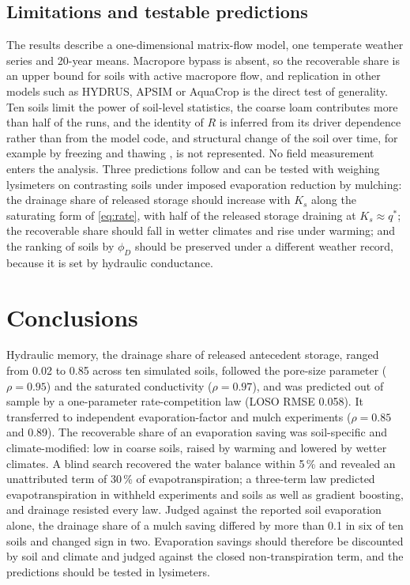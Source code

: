 \documentclass[review,12pt,authoryear]{elsarticle}
\begin{document}
\subsection{Limitations and testable predictions}
The results describe a one-dimensional matrix-flow model, one temperate weather series and 20-year means. Macropore bypass \citep{Jarvis2007,Beven1982} is absent, so the recoverable share is an upper bound for soils with active macropore flow, and replication in other models such as HYDRUS, APSIM or AquaCrop \citep{Simunek2008,Simunek2016,Keating2003,Steduto2009,Vereecken2016} is the direct test of generality. Ten soils limit the power of soil-level statistics, the coarse loam contributes more than half of the runs, and the identity of $R$ is inferred from its driver dependence rather than from the model code, and structural change of the soil over time, for example by freezing and thawing \citep{Leuther2021,MirandaVelez2023}, is not represented. No field measurement enters the analysis. Three predictions follow and can be tested with weighing lysimeters on contrasting soils under imposed evaporation reduction by mulching: the drainage share of released storage should increase with $K_s$ along the saturating form of \cref{eq:rate}, with half of the released storage draining at $K_s\approx q^\ast$; the recoverable share should fall in wetter climates and rise under warming; and the ranking of soils by $\phi_D$ should be preserved under a different weather record, because it is set by hydraulic conductance.

\section{Conclusions}
Hydraulic memory, the drainage share of released antecedent storage, ranged from 0.02 to 0.85 across ten simulated soils, followed the pore-size parameter ($\rho=0.95$) and the saturated conductivity ($\rho=0.97$), and was predicted out of sample by a one-parameter rate-competition law (LOSO RMSE 0.058). It transferred to independent evaporation-factor and mulch experiments ($\rho=0.85$ and 0.89). The recoverable share of an evaporation saving was soil-specific and climate-modified: low in coarse soils, raised by warming and lowered by wetter climates. A blind search recovered the water balance within 5\,\% and revealed an unattributed term of 30\,\% of evapotranspiration; a three-term law predicted evapotranspiration in withheld experiments and soils as well as gradient boosting, and drainage resisted every law. Judged against the reported soil evaporation alone, the drainage share of a mulch saving differed by more than 0.1 in six of ten soils and changed sign in two. Evaporation savings should therefore be discounted by soil and climate and judged against the closed non-transpiration term, and the predictions should be tested in lysimeters.
\end{document}
